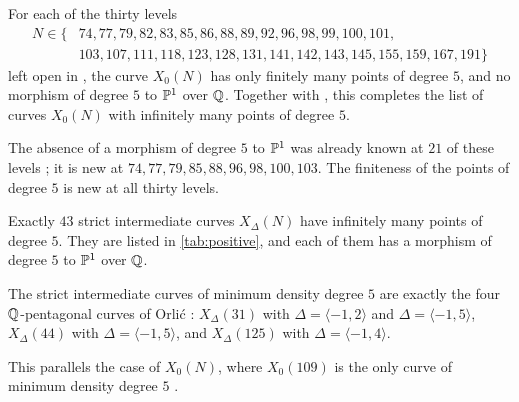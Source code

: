 \begin{theoremA}\label{thm:A}
For each of the thirty levels
\begin{align*}
 N\in\{&74, 77, 79, 82, 83, 85, 86, 88, 89, 92, 96, 98, 99, 100, 101,\\
 &103, 107, 111, 118, 123, 128, 131, 141, 142, 143, 145, 155, 159, 167, 191\}
\end{align*}
left open in \cite[Remark~1.11 and \S7]{DHJO}, the curve $X_0(N)$ has only finitely many points of degree $5$, and no
morphism of degree $5$ to $\mathbb{P}^1$ over $\mathbb{Q}$. Together with \cite[Theorem~1.10]{DHJO}, this completes the
list of curves $X_0(N)$ with infinitely many points of degree $5$.
\end{theoremA}

The absence of a morphism of degree $5$ to $\mathbb{P}^1$ was already known at $21$ of these levels \cite[\S7.2 and
Table~2]{DHJO}; it is new at $74,77,79,85,88,96,98,100,103$. The finiteness of the points of degree $5$ is new at all
thirty levels.

\begin{theoremB}\label{thm:B}
Exactly $43$ strict intermediate curves $X_\Delta(N)$ have infinitely many points of degree $5$. They are
listed in \cref{tab:positive}, and each of them has a morphism of degree $5$ to $\mathbb{P}^1$ over $\mathbb{Q}$.
\end{theoremB}

\begin{corollaryE}\label{cor:E}
The strict intermediate curves of minimum density degree $5$ are exactly the four $\mathbb{Q}$-pentagonal curves of
Orli\'c \cite[Theorems~1.4--1.5]{Orlic2025}: $X_\Delta(31)$ with $\Delta=\langle-1,2\rangle$ and
$\Delta=\langle-1,5\rangle$, $X_\Delta(44)$ with $\Delta=\langle-1,5\rangle$, and $X_\Delta(125)$ with
$\Delta=\langle-1,4\rangle$.
\end{corollaryE}

This parallels the case of $X_0(N)$, where $X_0(109)$ is the only curve of minimum density degree $5$ \cite{DHJO}.

